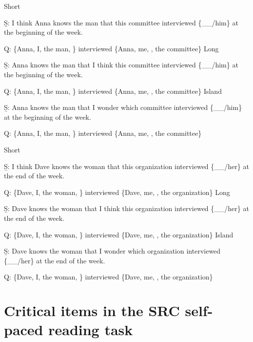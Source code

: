 \pex 
\a Short\par\nobreak
\beginsubsub 
\b{S:} I think Anna knows the man that this committee interviewed \{\_\_/him\} at the beginning of the week.\par\nobreak
\b{Q:} \{Anna, I, the man, \} interviewed \{Anna, me, , the committee\}
\endsubsub
\a Long\par\nobreak
\beginsubsub
\b{S:} Anna knows the man that I think this committee interviewed \{\_\_/him\} at the beginning of the week.\par\nobreak
\b{Q:} \{Anna, I, the man, \} interviewed \{Anna, me, , the committee\}
\endsubsub
\a Island\par\nobreak
\beginsubsub
\b{S:} Anna knows the man that I wonder which committee interviewed \{\_\_/him\} at the beginning of the week.\par\nobreak
\b{Q:} \{Anna, I, the man, \} interviewed \{Anna, me, , the committee\}
\endsubsub
\xe

\pex 
\a Short\par\nobreak
\beginsubsub 
\b{S:} I think Dave knows the woman that this organization interviewed \{\_\_/her\} at the end of the week.\par\nobreak
\b{Q:} \{Dave, I, the woman, \} interviewed \{Dave, me, , the organization\}
\endsubsub
\a Long\par\nobreak
\beginsubsub
\b{S:} Dave knows the woman that I think this organization interviewed \{\_\_/her\} at the end of the week.\par\nobreak
\b{Q:} \{Dave, I, the woman, \} interviewed \{Dave, me, , the organization\}
\endsubsub
\a Island\par\nobreak
\beginsubsub
\b{S:} Dave knows the woman that I wonder which organization interviewed \{\_\_/her\} at the end of the week.\par\nobreak
\b{Q:} \{Dave, I, the woman, \} interviewed \{Dave, me, , the organization\}
\endsubsub
\xe

\section{Critical items in the SRC self-paced reading task}

